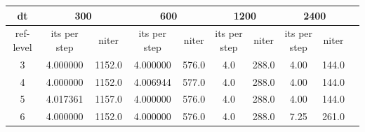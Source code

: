 \documentclass[a4paper, 12pt]{article}
\begin{document}
\begin{table}[h]\centering
\begin{scriptsize}
\begin{tabular}{c|c|c|c|c|c|c|c|c|c}
\multicolumn{0}{c|}{dt} &
\multicolumn{2}{c|}{300} &
\multicolumn{2}{c|}{600} &
\multicolumn{2}{c|}{1200} &
\multicolumn{2}{c|}{2400}
\\ \hline\hline
ref-level &   its per step &   niter & its per step &   niter & its per step &   niter & its per step &   niter\\ \hline
     3    &      4.000000  & 1152.0 & 4.000000 & 576.0 & 4.0 & 288.0 & 4.00 & 144.0\\
     4   &      4.000000  & 1152.0  & 4.006944 & 577.0 & 4.0 & 288.0 & 4.00 & 144.0\\
     5   &      4.017361  & 1157.0  & 4.000000 & 576.0 & 4.0 & 288.0 & 4.00 & 144.0\\
     6   &      4.000000  & 1152.0 & 4.000000 & 576.0  & 4.0 & 288.0 & 7.25 & 261.0\\
\end{tabular}
\bigskip


\end{scriptsize}
\end{table}
\end{document}
